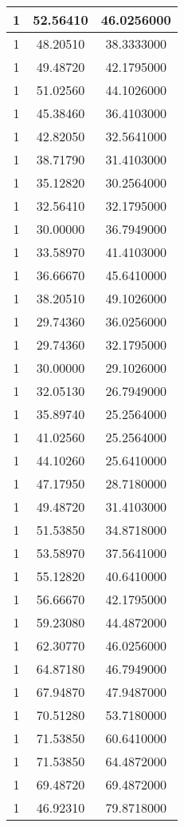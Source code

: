 \documentclass[
]{book}
\begin{document}
\begin{tabular}{c|c|c}
\hline
1 & 52.56410 & 46.0256000\\
\hline
1 & 48.20510 & 38.3333000\\
\hline
1 & 49.48720 & 42.1795000\\
\hline
1 & 51.02560 & 44.1026000\\
\hline
1 & 45.38460 & 36.4103000\\
\hline
1 & 42.82050 & 32.5641000\\
\hline
1 & 38.71790 & 31.4103000\\
\hline
1 & 35.12820 & 30.2564000\\
\hline
1 & 32.56410 & 32.1795000\\
\hline
1 & 30.00000 & 36.7949000\\
\hline
1 & 33.58970 & 41.4103000\\
\hline
1 & 36.66670 & 45.6410000\\
\hline
1 & 38.20510 & 49.1026000\\
\hline
1 & 29.74360 & 36.0256000\\
\hline
1 & 29.74360 & 32.1795000\\
\hline
1 & 30.00000 & 29.1026000\\
\hline
1 & 32.05130 & 26.7949000\\
\hline
1 & 35.89740 & 25.2564000\\
\hline
1 & 41.02560 & 25.2564000\\
\hline
1 & 44.10260 & 25.6410000\\
\hline
1 & 47.17950 & 28.7180000\\
\hline
1 & 49.48720 & 31.4103000\\
\hline
1 & 51.53850 & 34.8718000\\
\hline
1 & 53.58970 & 37.5641000\\
\hline
1 & 55.12820 & 40.6410000\\
\hline
1 & 56.66670 & 42.1795000\\
\hline
1 & 59.23080 & 44.4872000\\
\hline
1 & 62.30770 & 46.0256000\\
\hline
1 & 64.87180 & 46.7949000\\
\hline
1 & 67.94870 & 47.9487000\\
\hline
1 & 70.51280 & 53.7180000\\
\hline
1 & 71.53850 & 60.6410000\\
\hline
1 & 71.53850 & 64.4872000\\
\hline
1 & 69.48720 & 69.4872000\\
\hline
1 & 46.92310 & 79.8718000\\

\end{tabular}
\end{document}
